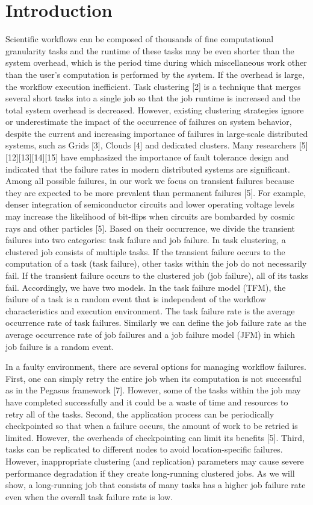 \documentclass{IOS-Book-Article}
\begin{document}
\section*{Introduction}
Scientific workflows can be composed of thousands of fine computational granularity tasks and the runtime of these tasks may be even shorter than the system overhead, which is the period time during which miscellaneous work other than the user’s computation is performed by the system. If the overhead is large, the workflow execution inefficient. Task clustering [2] is a technique that merges several short tasks into a single job so that the job runtime is increased and the total system overhead is decreased. However, existing clustering strategies ignore or underestimate the impact of the occurrence of failures on system behavior, despite the current and increasing importance of failures in large-scale distributed systems, such as Grids [3], Clouds [4] and dedicated clusters. Many researchers [5][12][13][14][15] have emphasized the importance of fault tolerance design and indicated that the failure rates in modern distributed systems are significant. Among all possible failures, in our work we focus on transient failures because they are expected to be more prevalent than permanent failures [5]. For example, denser integration of semiconductor circuits and lower operating voltage levels may increase the likelihood of bit-flips when circuits are bombarded by cosmic rays and other particles [5]. Based on their occurrence, we divide the transient failures into two categories: task failure and job failure. In task clustering, a clustered job consists of multiple tasks. If the transient failure occurs to the computation of a task (task failure), other tasks within the job do not necessarily fail. If the transient failure occurs to the clustered job (job failure), all of its tasks fail. Accordingly, we have two models. In the task failure model (TFM), the failure of a task is a random event that is independent of the workflow characteristics and execution environment. The task failure rate is the average occurrence rate of task failures. Similarly we can define the job failure rate as the average occurrence rate of job failures and a job failure model (JFM) in which job failure is a random event. 

In a faulty environment, there are several options for managing workflow failures. First, one can simply retry the entire job when its computation is not successful as in the Pegasus framework [7]. However, some of the tasks within the job may have completed successfully and it could be a waste of time and resources to retry all of the tasks. Second, the application process can be periodically checkpointed so that when a failure occurs, the amount of work to be retried is limited. However, the overheads of checkpointing can limit its benefits [5]. Third, tasks can be replicated to different nodes to avoid location-specific failures. However, inappropriate clustering (and replication) parameters may cause severe performance degradation if they create long-running clustered jobs. As we will show, a long-running job that consists of many tasks has a higher job failure rate even when the overall task failure rate is low.   
\end{document}
